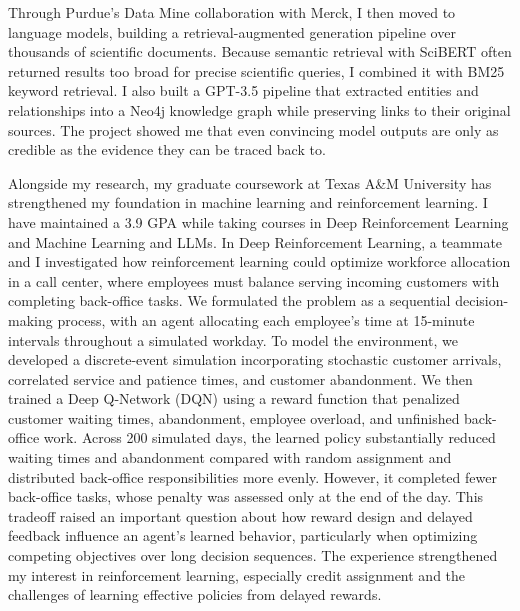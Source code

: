 \documentclass{article}
\begin{document}
Through Purdue’s Data Mine collaboration with Merck, I then moved to language models, building a retrieval-augmented generation pipeline over thousands of scientific documents. Because semantic retrieval with SciBERT often returned results too broad for precise scientific queries, I combined it with BM25 keyword retrieval. I also built a GPT-3.5 pipeline that extracted entities and relationships into a Neo4j knowledge graph while preserving links to their original sources. The project showed me that even convincing model outputs are only as credible as the evidence they can be traced back to.

Alongside my research, my graduate coursework at Texas A\&M University has strengthened my foundation in machine learning and reinforcement learning. I have maintained a 3.9 GPA while taking courses in Deep Reinforcement Learning and Machine Learning and LLMs. In Deep Reinforcement Learning, a teammate and I investigated how reinforcement learning could optimize workforce allocation in a call center, where employees must balance serving incoming customers with completing back-office tasks. We formulated the problem as a sequential decision-making process, with an agent allocating each employee's time at 15-minute intervals throughout a simulated workday. To model the environment, we developed a discrete-event simulation incorporating stochastic customer arrivals, correlated service and patience times, and customer abandonment. We then trained a Deep Q-Network (DQN) using a reward function that penalized customer waiting times, abandonment, employee overload, and unfinished back-office work. Across 200 simulated days, the learned policy substantially reduced waiting times and abandonment compared with random assignment and distributed back-office responsibilities more evenly. However, it completed fewer back-office tasks, whose penalty was assessed only at the end of the day. This tradeoff raised an important question about how reward design and delayed feedback influence an agent's learned behavior, particularly when optimizing competing objectives over long decision sequences. The experience strengthened my interest in reinforcement learning, especially credit assignment and the challenges of learning effective policies from delayed rewards.
\end{document}
